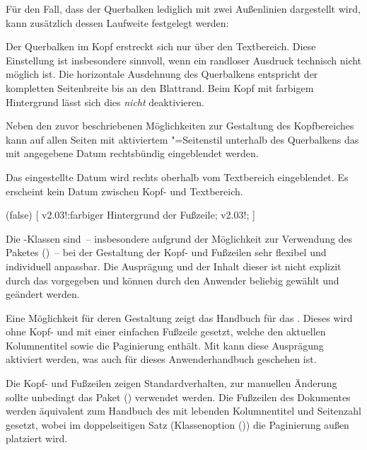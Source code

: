 \begin{DeclareEntity*}{}
\begin{DeclareEntity*}{}
\begin{DeclareEntity*}{}
\begin{Declaration}
Für den Fall, dass der Querbalken lediglich mit zwei Außenlinien dargestellt 
wird, kann zusätzlich dessen Laufweite festgelegt werden:
\begin{DeclareValues}
  Der Querbalken im Kopf erstreckt sich nur über den Textbereich. Diese 
  Einstellung ist insbesondere sinnvoll, wenn ein randloser Ausdruck technisch 
  nicht möglich ist. 
  Die horizontale Ausdehnung des Querbalkens entspricht der kompletten 
  Seitenbreite bis an den Blattrand. Beim Kopf mit farbigem Hintergrund lässt 
  sich dies \emph{nicht} deaktivieren.
\end{DeclareValues}

%
Neben den zuvor beschriebenen Möglichkeiten zur Gestaltung des Kopfbereiches 
kann auf allen Seiten mit aktiviertem "=Seitenstil 
unterhalb des Querbalkens das mit  angegebene Datum rechtsbündig 
eingeblendet werden.
\begin{DeclareValues}[Datum]
  Das eingestellte Datum wird rechts oberhalb vom Textbereich eingeblendet.
  Es erscheint kein Datum zwischen Kopf- und Textbereich.
\end{DeclareValues}
\end{Declaration}

\begin{Declaration}
  {}
  (false)
[%
  v2.03!:farbiger Hintergrund der Fußzeile;%
  v2.03!;%
]

Die \TUDScript-Klassen sind~-- insbesondere aufgrund der Möglichkeit zur 
Verwendung des Paketes ()~-- bei 
der Gestaltung der Kopf- und Fußzeilen sehr flexibel und individuell anpassbar. 
Die Ausprägung und der Inhalt dieser ist nicht explizit durch das \CD 
vorgegeben und können durch den Anwender beliebig gewählt und geändert werden. 

Eine Möglichkeit für deren Gestaltung zeigt das Handbuch für das \TUDCD. Dieses 
wird ohne Kopf- und mit einer einfachen Fußzeile gesetzt, welche den aktuellen 
Kolumnentitel sowie die Paginierung enthält. Mit  kann diese 
Ausprägung aktiviert werden, was auch für dieses Anwenderhandbuch geschehen ist.
\begin{DeclareValues}
  Die Kopf- und Fußzeilen zeigen Standardverhalten, zur manuellen Änderung 
  sollte unbedingt das Paket () 
  verwendet werden.
  Die Fußzeilen des Dokumentes werden äquivalent zum Handbuch des \TUDCDs mit 
  lebenden Kolumnentitel und Seitenzahl gesetzt, wobei im doppelseitigen Satz 
  (Klassenoption ()) die Paginierung 
  außen platziert wird.
\end{DeclareValues}


\end{Declaration}
\end{DeclareEntity*}
\end{DeclareEntity*}
\end{DeclareEntity*}
